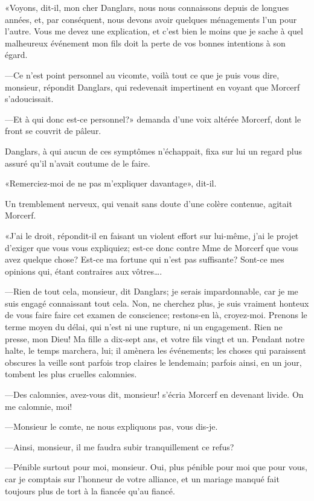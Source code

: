 «Voyons, dit-il, mon cher Danglars, nous nous connaissons depuis de longues années, et, par conséquent, nous devons avoir quelques ménagements l'un pour l'autre. Vous me devez une explication, et c'est bien le moins que je sache à quel malheureux événement mon fils doit la perte de vos bonnes intentions à son égard. 

—Ce n'est point personnel au vicomte, voilà tout ce que je puis vous dire, monsieur, répondit Danglars, qui redevenait impertinent en voyant que Morcerf s'adoucissait.  

—Et à qui donc est-ce personnel?» demanda d'une voix altérée Morcerf, dont le front se couvrit de pâleur. 

Danglars, à qui aucun de ces symptômes n'échappait, fixa sur lui un regard plus assuré qu'il n'avait coutume de le faire. 

«Remerciez-moi de ne pas m'expliquer davantage», dit-il. 

Un tremblement nerveux, qui venait sans doute d'une colère contenue, agitait Morcerf. 

«J'ai le droit, répondit-il en faisant un violent effort sur lui-même, j'ai le projet d'exiger que vous vous expliquiez; est-ce donc contre Mme de Morcerf que vous avez quelque chose? Est-ce ma fortune qui n'est pas suffisante? Sont-ce mes opinions qui, étant contraires aux vôtres\dots. 

—Rien de tout cela, monsieur, dit Danglars; je serais impardonnable, car je me suis engagé connaissant tout cela. Non, ne cherchez plus, je suis vraiment honteux de vous faire faire cet examen de conscience; restons-en là, croyez-moi. Prenons le terme moyen du délai, qui n'est ni une rupture, ni un engagement. Rien ne presse, mon Dieu! Ma fille a dix-sept ans, et votre fils vingt et un. Pendant notre halte, le temps marchera, lui; il amènera les événements; les choses qui paraissent obscures la veille sont parfois trop claires le lendemain; parfois ainsi, en un jour, tombent les plus cruelles calomnies. 

—Des calomnies, avez-vous dit, monsieur! s'écria Morcerf en devenant livide. On me calomnie, moi! 

—Monsieur le comte, ne nous expliquons pas, vous dis-je.  

—Ainsi, monsieur, il me faudra subir tranquillement ce refus? 

—Pénible surtout pour moi, monsieur. Oui, plus pénible pour moi que pour vous, car je comptais sur l'honneur de votre alliance, et un mariage manqué fait toujours plus de tort à la fiancée qu'au fiancé. 

